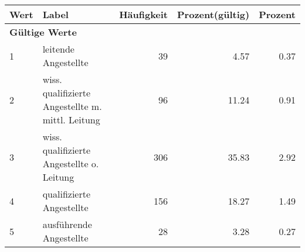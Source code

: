      \begin{longtable}{lXrrr}
     \toprule
     \textbf{Wert} & \textbf{Label} & \textbf{Häufigkeit} & \textbf{Prozent(gültig)} & \textbf{Prozent} \\
     \endhead
     \midrule
     \multicolumn{5}{l}{\textbf{Gültige Werte}}\\

     1 &
     \multicolumn{1}{X}{ leitende Angestellte   } &


       \num{39} &
       \num[round-mode=places,round-precision=2]{4,57} &
         \num[round-mode=places,round-precision=2]{0,37} \\

     2 &
     \multicolumn{1}{X}{ wiss. qualifizierte Angestellte m. mittl. Leitung   } &


       \num{96} &
       \num[round-mode=places,round-precision=2]{11,24} &
         \num[round-mode=places,round-precision=2]{0,91} \\

     3 &
     \multicolumn{1}{X}{ wiss. qualifizierte Angestellte o. Leitung   } &


       \num{306} &
       \num[round-mode=places,round-precision=2]{35,83} &
         \num[round-mode=places,round-precision=2]{2,92} \\

     4 &
     \multicolumn{1}{X}{ qualifizierte Angestellte   } &


       \num{156} &
       \num[round-mode=places,round-precision=2]{18,27} &
         \num[round-mode=places,round-precision=2]{1,49} \\

     5 &
     \multicolumn{1}{X}{ ausführende Angestellte   } &


       \num{28} &
       \num[round-mode=places,round-precision=2]{3,28} &
         \num[round-mode=places,round-precision=2]{0,27} \\


\end{longtable}
